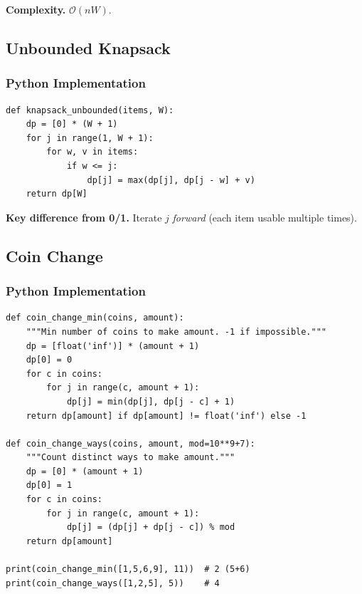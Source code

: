 \documentclass[10pt,a4paper]{article}
\theoremstyle{cpstyle}
\newcommand{\bigO}[1]{\mathcal{O}\!\left(#1\right)}
\begin{document}
\textbf{Complexity.} $\bigO{nW}$.

\subsection{Unbounded Knapsack}

\subsubsection{Python Implementation}
\begin{lstlisting}[caption={Unbounded Knapsack}]
def knapsack_unbounded(items, W):
    dp = [0] * (W + 1)
    for j in range(1, W + 1):
        for w, v in items:
            if w <= j:
                dp[j] = max(dp[j], dp[j - w] + v)
    return dp[W]
\end{lstlisting}

\textbf{Key difference from 0/1.} Iterate $j$ \emph{forward} (each item usable multiple times).

\subsection{Coin Change}

\subsubsection{Python Implementation}
\begin{lstlisting}[caption={Coin Change -- min coins and count ways}]
def coin_change_min(coins, amount):
    """Min number of coins to make amount. -1 if impossible."""
    dp = [float('inf')] * (amount + 1)
    dp[0] = 0
    for c in coins:
        for j in range(c, amount + 1):
            dp[j] = min(dp[j], dp[j - c] + 1)
    return dp[amount] if dp[amount] != float('inf') else -1

def coin_change_ways(coins, amount, mod=10**9+7):
    """Count distinct ways to make amount."""
    dp = [0] * (amount + 1)
    dp[0] = 1
    for c in coins:
        for j in range(c, amount + 1):
            dp[j] = (dp[j] + dp[j - c]) % mod
    return dp[amount]

print(coin_change_min([1,5,6,9], 11))  # 2 (5+6)
print(coin_change_ways([1,2,5], 5))    # 4
\end{lstlisting}

\end{document}
